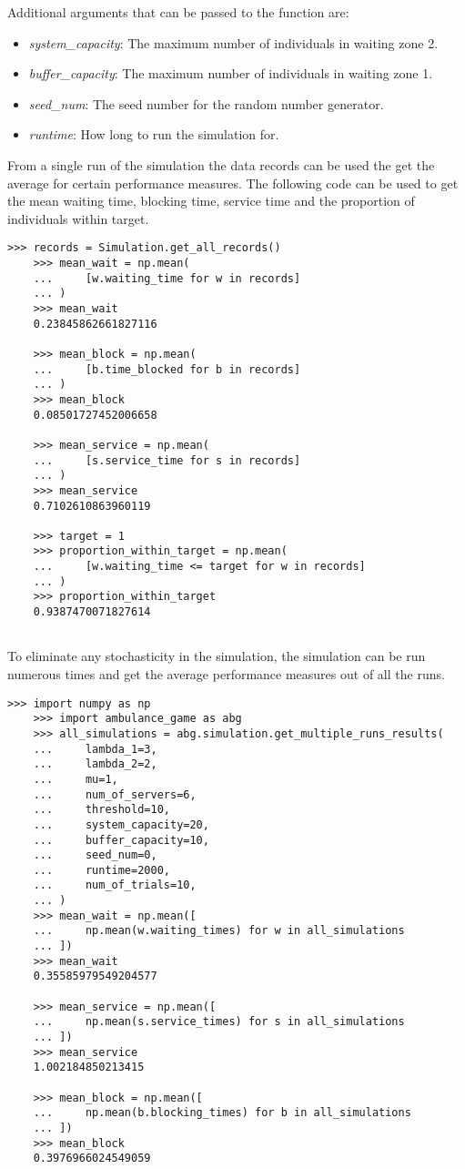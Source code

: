 Additional arguments that can be passed to the function are:
\begin{itemize}
    \item \textit{system\_capacity}: The maximum number of individuals in 
    waiting zone 2.
    \item \textit{buffer\_capacity}: The maximum number of individuals in 
    waiting zone 1.
    \item \textit{seed\_num}: The seed number for the random number generator.
    \item \textit{runtime}: How long to run the simulation for.
\end{itemize}

From a single run of the simulation the data records can be used the get the
average for certain performance measures. 
The following code can be used to get the mean waiting time, blocking time, 
service time and the proportion of individuals within target.

\begin{lstlisting}[style=pystyle]
    >>> records = Simulation.get_all_records()
    >>> mean_wait = np.mean(
    ...     [w.waiting_time for w in records]
    ... )
    >>> mean_wait
    0.23845862661827116

    >>> mean_block = np.mean(
    ...     [b.time_blocked for b in records]
    ... )
    >>> mean_block
    0.08501727452006658

    >>> mean_service = np.mean(
    ...     [s.service_time for s in records]
    ... )
    >>> mean_service
    0.7102610863960119

    >>> target = 1
    >>> proportion_within_target = np.mean(
    ...     [w.waiting_time <= target for w in records]
    ... )
    >>> proportion_within_target
    0.9387470071827614
    
\end{lstlisting}


To eliminate any stochasticity in the simulation, the simulation can be run
numerous times and get the average performance measures out of all the runs.


\begin{lstlisting}[style=pystyle]
    >>> import numpy as np
    >>> import ambulance_game as abg
    >>> all_simulations = abg.simulation.get_multiple_runs_results(
    ...     lambda_1=3,
    ...     lambda_2=2,
    ...     mu=1,
    ...     num_of_servers=6,
    ...     threshold=10,
    ...     system_capacity=20,
    ...     buffer_capacity=10,
    ...     seed_num=0,
    ...     runtime=2000,
    ...     num_of_trials=10,
    ... )
    >>> mean_wait = np.mean([
    ...     np.mean(w.waiting_times) for w in all_simulations
    ... ])
    >>> mean_wait
    0.35585979549204577

    >>> mean_service = np.mean([
    ...     np.mean(s.service_times) for s in all_simulations
    ... ])
    >>> mean_service
    1.002184850213415

    >>> mean_block = np.mean([
    ...     np.mean(b.blocking_times) for b in all_simulations
    ... ])
    >>> mean_block
    0.3976966024549059

\end{lstlisting}

